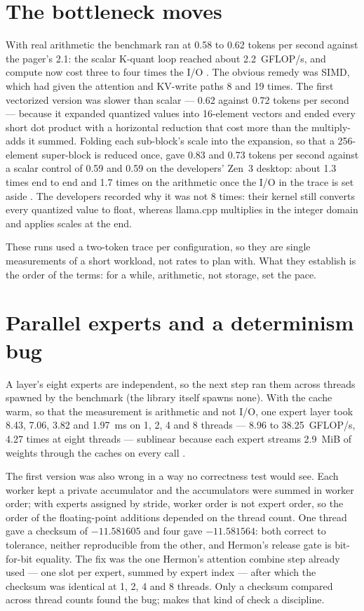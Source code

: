 \section{The bottleneck moves}

With real arithmetic the benchmark ran at 0.58 to 0.62 tokens per second
against the pager's 2.1: the scalar K-quant loop reached about 2.2~GFLOP/s, and
compute now cost three to four times the I/O \cite{hermon2026expertffn}. The
obvious remedy was SIMD, which had given the attention and KV-write paths 8
and 19 times. The first vectorized version was slower than scalar --- 0.62
against 0.72 tokens per second --- because it expanded quantized values into
16-element vectors and ended every short dot product with a horizontal
reduction that cost more than the multiply-adds it summed. Folding each
sub-block's scale into the expansion, so that a 256-element super-block is
reduced once, gave 0.83 and 0.73 tokens per second against a scalar control of
0.59 and 0.59 on the developers' Zen~3 desktop: about 1.3 times end to end and
1.7 times on the arithmetic once the I/O in the trace is set aside
\cite{hermon2026simd}. The developers recorded why it was not 8 times:
their kernel still converts every quantized value to float, whereas llama.cpp
multiplies in the integer domain and applies scales at the end.

These runs used a two-token trace per configuration, so they are single
measurements of a short workload, not rates to plan with. What they establish
is the order of the terms: for a while, arithmetic, not storage, set the pace.

\section{Parallel experts and a determinism bug}

A layer's eight experts are independent, so the next step ran them across
threads spawned by the benchmark (the library itself spawns none). With the
cache warm, so that the measurement is arithmetic and not I/O, one expert
layer took 8.43, 7.06, 3.82 and 1.97~ms on 1, 2, 4 and 8 threads --- 8.96 to
38.25~GFLOP/s, 4.27 times at eight threads --- sublinear because each expert
streams 2.9~MiB of weights through the caches on every call
\cite{hermon2026parallel}.

The first version was also wrong in a way no correctness test would see. Each
worker kept a private accumulator and the accumulators were summed in worker
order; with experts assigned by stride, worker order is not expert order, so
the order of the floating-point additions depended on the thread count. One
thread gave a checksum of $-11.581605$ and four gave $-11.581564$: both correct to
tolerance, neither reproducible from the other, and Hermon's release gate is
bit-for-bit equality. The fix was the one Hermon's attention combine step
already used --- one slot per expert, summed by expert index --- after which the
checksum was identical at 1, 2, 4 and 8 threads. Only a checksum compared
across thread counts found the bug;  makes that kind
of check a discipline.


